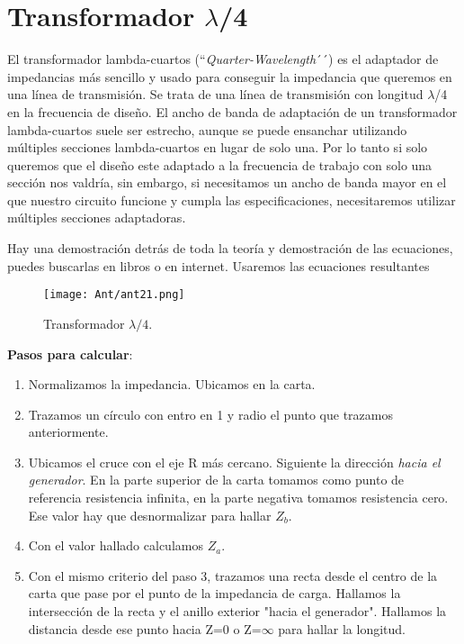 \documentclass[
	12pt, %
	fleqn, %
	a4paper, %
	oneside, %
]{LegrandOrangeBook}
\begin{document}
\section{Transformador $\lambda$/4}
El transformador lambda-cuartos (``\textit{Quarter-Wavelength}´´) es el adaptador de impedancias más sencillo y usado para conseguir la impedancia que queremos en una línea de transmisión. Se trata de una línea de transmisión con longitud $\lambda$/4 en la frecuencia de diseño. El ancho de banda de adaptación de un transformador lambda-cuartos suele ser estrecho, aunque se puede ensanchar utilizando múltiples secciones lambda-cuartos en lugar de solo una. Por lo tanto si solo queremos que el diseño este adaptado a la frecuencia de trabajo con solo una sección nos valdría, sin embargo, si necesitamos un ancho de banda mayor en el que nuestro circuito funcione y cumpla las especificaciones, necesitaremos utilizar múltiples secciones adaptadoras.\\
\begin{notation}
Hay una demostración detrás de toda la teoría y demostración de las ecuaciones, puedes buscarlas en libros o en internet. Usaremos las ecuaciones resultantes
\end{notation}
\begin{figure}[H]
\centering
\texttt{[image: Ant/ant21.png]}
\caption{Transformador $\lambda/4$.}
\label{fig:trans lambda}
\end{figure}
\textbf{Pasos para calcular}:
\begin{enumerate}
\item Normalizamos la impedancia. Ubicamos en la carta.
\item Trazamos un círculo con entro en 1 y radio el punto que trazamos anteriormente.
\item Ubicamos el cruce con el eje R más cercano. Siguiente la dirección \textit{hacia el generador}. En la parte superior de la carta tomamos como punto de referencia resistencia infinita, en la parte negativa tomamos resistencia cero. Ese valor hay que desnormalizar para hallar $Z_b$.
\item Con el valor hallado calculamos $Z_a$.
\item Con el mismo criterio del paso 3, trazamos una recta desde el centro de la carta que pase por el punto de la impedancia de carga. Hallamos la intersección de la recta y el anillo exterior "hacia el generador". Hallamos la distancia desde ese punto hacia Z=0 o Z=$\infty$ para hallar la longitud.
\end{enumerate}
\end{document}
